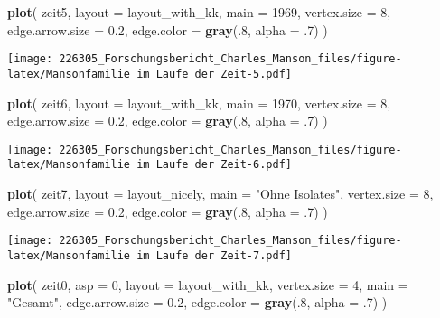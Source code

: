 \documentclass[
]{article}
\newenvironment{Shaded}{\begin{snugshade}}{\end{snugshade}}
\newcommand{\DataTypeTok}[1]{\textcolor[rgb]{0.13,0.29,0.53}{#1}}
\newcommand{\DecValTok}[1]{\textcolor[rgb]{0.00,0.00,0.81}{#1}}
\newcommand{\FloatTok}[1]{\textcolor[rgb]{0.00,0.00,0.81}{#1}}
\newcommand{\KeywordTok}[1]{\textcolor[rgb]{0.13,0.29,0.53}{\textbf{#1}}}
\newcommand{\NormalTok}[1]{#1}
\newcommand{\StringTok}[1]{\textcolor[rgb]{0.31,0.60,0.02}{#1}}
\begin{document}
\begin{Shaded}
\begin{Highlighting}[]
\KeywordTok{plot}\NormalTok{(}
\NormalTok{  zeit5,}
  \DataTypeTok{layout =}\NormalTok{ layout_with_kk,}
  \DataTypeTok{main =} \DecValTok{1969}\NormalTok{,}
  \DataTypeTok{vertex.size =} \DecValTok{8}\NormalTok{,}
  \DataTypeTok{edge.arrow.size =} \FloatTok{0.2}\NormalTok{,}
  \DataTypeTok{edge.color =} \KeywordTok{gray}\NormalTok{(.}\DecValTok{8}\NormalTok{, }\DataTypeTok{alpha =} \FloatTok{.7}\NormalTok{)}
\NormalTok{)}
\end{Highlighting}
\end{Shaded}

\texttt{[image: 226305\_Forschungsbericht\_Charles\_Manson\_files/figure-latex/Mansonfamilie im Laufe der Zeit-5.pdf]}

\begin{Shaded}
\begin{Highlighting}[]
\KeywordTok{plot}\NormalTok{(}
\NormalTok{  zeit6,}
  \DataTypeTok{layout =}\NormalTok{ layout_with_kk,}
  \DataTypeTok{main =} \DecValTok{1970}\NormalTok{,}
  \DataTypeTok{vertex.size =} \DecValTok{8}\NormalTok{,}
  \DataTypeTok{edge.arrow.size =} \FloatTok{0.2}\NormalTok{,}
  \DataTypeTok{edge.color =} \KeywordTok{gray}\NormalTok{(.}\DecValTok{8}\NormalTok{, }\DataTypeTok{alpha =} \FloatTok{.7}\NormalTok{)}
\NormalTok{)}
\end{Highlighting}
\end{Shaded}

\texttt{[image: 226305\_Forschungsbericht\_Charles\_Manson\_files/figure-latex/Mansonfamilie im Laufe der Zeit-6.pdf]}

\begin{Shaded}
\begin{Highlighting}[]
\KeywordTok{plot}\NormalTok{(}
\NormalTok{  zeit7,}
  \DataTypeTok{layout =}\NormalTok{ layout_nicely,}
  \DataTypeTok{main =} \StringTok{"Ohne Isolates"}\NormalTok{,}
  \DataTypeTok{vertex.size =} \DecValTok{8}\NormalTok{,}
  \DataTypeTok{edge.arrow.size =} \FloatTok{0.2}\NormalTok{,}
  \DataTypeTok{edge.color =} \KeywordTok{gray}\NormalTok{(.}\DecValTok{8}\NormalTok{, }\DataTypeTok{alpha =} \FloatTok{.7}\NormalTok{)}
\NormalTok{)}
\end{Highlighting}
\end{Shaded}

\texttt{[image: 226305\_Forschungsbericht\_Charles\_Manson\_files/figure-latex/Mansonfamilie im Laufe der Zeit-7.pdf]}

\begin{Shaded}
\begin{Highlighting}[]
\KeywordTok{plot}\NormalTok{(}
\NormalTok{  zeit0,}
  \DataTypeTok{asp =} \DecValTok{0}\NormalTok{,}
  \DataTypeTok{layout =}\NormalTok{ layout_with_kk,}
  \DataTypeTok{vertex.size =} \DecValTok{4}\NormalTok{,}
  \DataTypeTok{main =} \StringTok{"Gesamt"}\NormalTok{,}
  \DataTypeTok{edge.arrow.size =} \FloatTok{0.2}\NormalTok{,}
  \DataTypeTok{edge.color =} \KeywordTok{gray}\NormalTok{(.}\DecValTok{8}\NormalTok{, }\DataTypeTok{alpha =} \FloatTok{.7}\NormalTok{)}
\NormalTok{)}
\end{Highlighting}
\end{Shaded}
\end{document}
